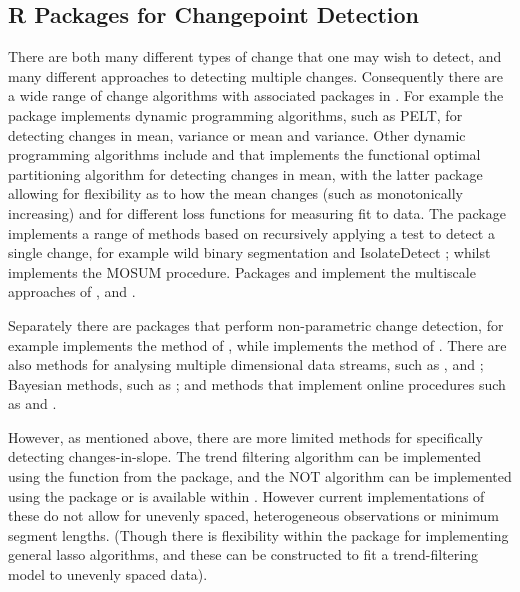 \documentclass[nojss]{jss}
\begin{document}
\subsection{R Packages for Changepoint Detection}

There are both many different types of change that one may wish to detect, and many different approaches to detecting multiple changes. Consequently there are a wide range of change algorithms with associated packages in . For example the  package \citep{killick2014changepoint} implements dynamic programming algorithms, such as PELT, for detecting changes in mean, variance or mean and variance. Other dynamic programming algorithms include  and  \citep{runge2020gfpop} that implements the functional optimal partitioning algorithm \citep{maidstone2017optimal} for detecting changes in mean, with the latter package allowing for flexibility as to how the mean changes (such as monotonically increasing) and for different loss functions for measuring fit to data. The  package implements a range of methods based on recursively applying a test to detect a single change, for example wild binary segmentation \citep{fryzlewicz2014wild} and IsolateDetect \citep{anastasiou2022detecting}; whilst  \citep{meier2021mosum} implements the MOSUM procedure. Packages  and  implement the multiscale approaches of \cite{frick2014multiscale}, \cite{pein2017heterogeneous} and \cite{li2016fdr}.

Separately there are packages that perform non-parametric change detection, for example  \citep{james2015ecp} implements the method of \cite{matteson2014nonparametric}, while   implements the method of \cite{haynes2017NP}. There are also methods for analysing multiple dimensional data streams, such as  \citep{wang2018high}, %
and  \citep{grundy2020high}; Bayesian methods, such as  \citep{erdman2008bcp}; and methods that implement online procedures such as  \citep{ross2015parametric} and  \citep{romano2021fast}.

However, as mentioned above, there are more limited methods for specifically detecting changes-in-slope. The trend filtering algorithm can be implemented using the  function from the  \citep{genlasso} package, and the NOT algorithm can be implemented using the  package or is available within . However current implementations of these do not allow for unevenly spaced, heterogeneous observations or minimum segment lengths. (Though there is flexibility within the  package for implementing general lasso algorithms, and these can be constructed to fit a trend-filtering model to unevenly spaced data). 
\end{document}
